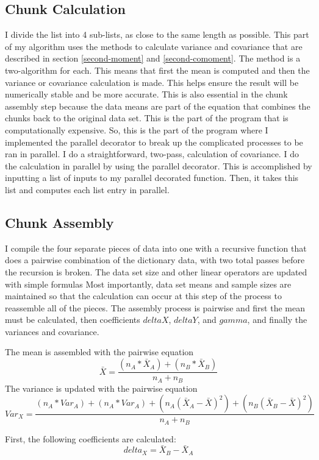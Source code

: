 \documentclass{article}
\begin{document}
     \subsection{Chunk Calculation}
I divide the list into 4 sub-lists, as close to the same length as possible. This part of my algorithm uses the methods to calculate variance and covariance that are described in section \ref{second-moment} and \ref{second-comoment}. The method is a two-algorithm for each. This means that first the mean is computed and then the variance or covariance calculation is made. This helps ensure the result will be numerically stable and be more accurate. This is also essential in the chunk assembly step because the data means are part of the equation that combines the chunks back to the original data set. This is the part of the program that is computationally expensive. So, this is the part of the program where I implemented the parallel decorator to break up the complicated processes to be ran in parallel. I do a straightforward, two-pass, calculation of covariance. I do the calculation in parallel by using the parallel decorator. This is accomplished by inputting a list of inputs to my parallel decorated function. Then, it takes this list and computes each list entry in parallel. \cite{parallel}
    
    \subsection{Chunk Assembly}
I compile the four separate pieces of data into one with a recursive function that does a pairwise combination of the dictionary data, with two total passes before the recursion is broken. The data set size and other linear operators are updated with simple formulas \cite{wiki} Most importantly, data set means and sample sizes are maintained so that the calculation can occur at this step of the process to reassemble all of the pieces. The assembly process is pairwise and first the mean must be calculated, then coefficients $deltaX$, $deltaY$, and $gamma$, and finally the variances and covariance. 

The mean is assembled with the pairwise equation $$\bar{X} = \frac{(n_{A} * \bar{X}_{A})+(n_{B} * \bar{X}_{B})}{n_{A}+n_{B}}$$
The variance is updated with the pairwise equation $$Var_{X} = \frac{(n_{A}*Var_{A}) + (n_{A}*Var_{A}) + (n_{A}(\bar{X}_{A} - \bar{X})^{2}) + (n_{B}(\bar{X}_{B} - \bar{X})^{2})}{n_{A}+n_{B}}$$
\cite{pairwise}

First, the following coefficients are calculated:
$$delta_{X} = \bar{X}_{B} - \bar{X}_{A}$$
\end{document}
